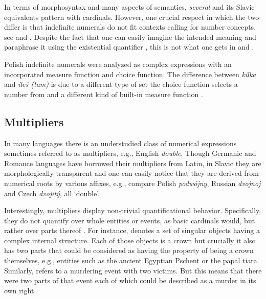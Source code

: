 \documentclass[output=paper]{langscibook}
\begin{document}
In terms of morphosyntax and many aspects of semantics, \textit{several} and its Slavic equivalents pattern with cardinals. However, one crucial respect in which the two differ is that indefinite numerals do not fit contexts calling for number concepts, see  and  \citep{schwarzschild2002grammar,wagiel2020several}. Despite the fact that one can easily imagine the intended meaning and paraphrase it using the existential quantifier , this is not what one gets in  and .

\ea\label{ex:several} \label{ex:arithmetical-several}
	\label{ex:arithmetical-several-paraphrase}
    \z
    \z

	\label{ex:arithmetical-kilka-iles}
    \z

	\noindent Polish indefinite numerals were analyzed as complex expressions with an incorporated measure function and choice function. The difference between \textit{kilka} and \textit{ileś (tam)} is due to a different type of set the choice function selects a number from and a different kind of built-in measure function \citep{wagiel2020several}.
	
	\subsection{Multipliers}\label{sec:multipliers}
	
	In many languages there is an understudied class of numerical expressions sometimes referred to as multipliers, e.g., English \textit{double}. Though Germanic and Romance languages have borrowed their multipliers from Latin, in Slavic they are morphologically transparent and one can easily notice that they are derived from numerical roots by various affixes, e.g., compare Polish \textit{podwójny}, Russian \textit{dvojnoj} and Czech \textit{dvojitý}, all `double'.
	
	Interestingly, multipliers display non-trivial quantificational behavior. Specifically, they do not quantify over whole entities or events, as basic cardinals would, but rather over parts thereof \citep{wagiel2018subatomic,wagiel2020entities}. For instance,  denotes a set of singular objects having a complex internal structure. Each of those objects is a crown but crucially it also has two parts that could be considered as having the property of being a crown themselves, e.g., entities such as the ancient Egyptian Pschent or the papal tiara. Similarly,  refers to a murdering event with two victims. But this means that there were two parts of that event each of which could be described as a murder in its own right.
	
\end{document}
